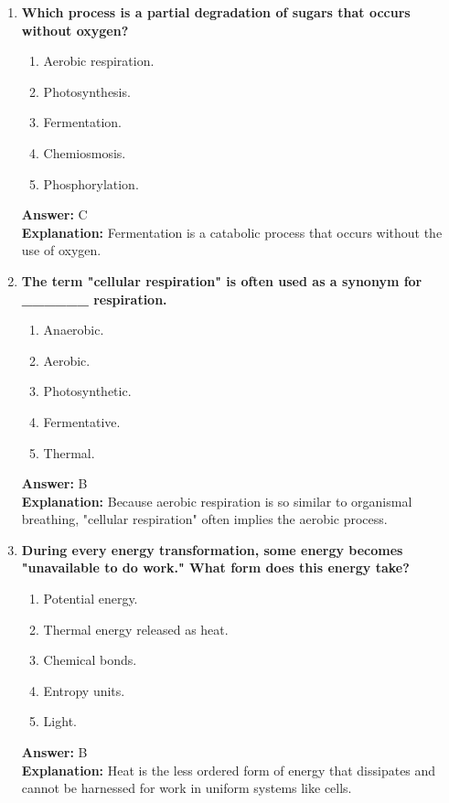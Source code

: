 \documentclass[11pt, a4paper]{article}
\begin{document}
\begin{enumerate}[leftmargin=*, label=\arabic*.]
\item \textbf{Which process is a partial degradation of sugars that occurs without oxygen?}
\begin{enumerate}[label=\Alph*.]
    \item Aerobic respiration.
    \item Photosynthesis.
    \item Fermentation.
    \item Chemiosmosis.
    \item Phosphorylation.
\end{enumerate}
\textbf{Answer:} C \\
\textbf{Explanation:} Fermentation is a catabolic process that occurs without the use of oxygen.

\item \textbf{The term "cellular respiration" is often used as a synonym for \_\_\_\_\_\_ respiration.}
\begin{enumerate}[label=\Alph*.]
    \item Anaerobic.
    \item Aerobic.
    \item Photosynthetic.
    \item Fermentative.
    \item Thermal.
\end{enumerate}
\textbf{Answer:} B \\
\textbf{Explanation:} Because aerobic respiration is so similar to organismal breathing, "cellular respiration" often implies the aerobic process.

\item \textbf{During every energy transformation, some energy becomes "unavailable to do work." What form does this energy take?}
\begin{enumerate}[label=\Alph*.]
    \item Potential energy.
    \item Thermal energy released as heat.
    \item Chemical bonds.
    \item Entropy units.
    \item Light.
\end{enumerate}
\textbf{Answer:} B \\
\textbf{Explanation:} Heat is the less ordered form of energy that dissipates and cannot be harnessed for work in uniform systems like cells.


\end{enumerate}
\end{document}
